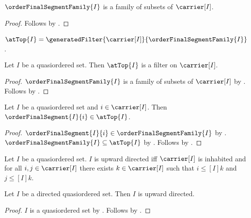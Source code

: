 \begin{proposition}\label{order_final_segment_family_type}
    $\orderFinalSegmentFamily{I}$ is a family of subsets of
        $\carrier[I]$.
\end{proposition}
\begin{proof}
    Follows by
        .
\end{proof}

\begin{definition}\label{at_top_filter}
    $\atTop{I}
        =\generatedFilter{\carrier[I]}{\orderFinalSegmentFamily{I}}$.
\end{definition}

\begin{classification}\label{at_top_is_filter}
    Let $I$ be a quasiordered set.
    Then $\atTop{I}$ is a filter on $\carrier[I]$.
\end{classification}
\begin{proof}
    $\orderFinalSegmentFamily{I}$ is a family of subsets of
        $\carrier[I]$ by .
    Follows by .
\end{proof}

\begin{proposition}\label{order_final_segment_in_at_top}
    Let $I$ be a quasiordered set and $i\in\carrier[I]$.
    Then $\orderFinalSegment{I}{i}\in\atTop{I}$.
\end{proposition}
\begin{proof}
    $\orderFinalSegment{I}{i}\in\orderFinalSegmentFamily{I}$ by
        .
    $\orderFinalSegmentFamily{I}\subseteq\atTop{I}$ by
        .
    Follows by .
\end{proof}

\begin{definition}\label{upward_directed_quasiorder}
    Let $I$ be a quasiordered set.
    $I$ is upward directed iff $\carrier[I]$ is inhabited and
        for all $i,j\in\carrier[I]$ there exists $k\in\carrier[I]$
        such that $i\mathrel{\leq[I]}k$ and
        $j\mathrel{\leq[I]}k$.
\end{definition}

\begin{proposition}\label{directed_quasiorder_is_upward_directed}
    Let $I$ be a directed quasiordered set.
    Then $I$ is upward directed.
\end{proposition}
\begin{proof}
    $I$ is a quasiordered set by
        .
    Follows by
        .
\end{proof}

